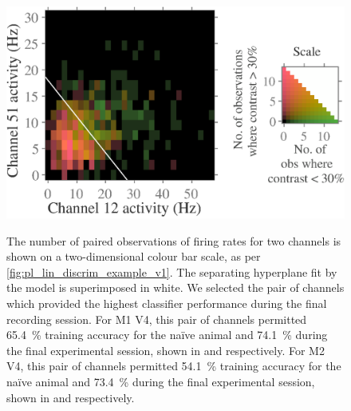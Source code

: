 \begin{figure}[htbp]
{        \includegraphics[scale=.29]{figs/decoding/lindiscrimexLCH-RG-log_cbl_v4_blanco_341_12vs51.eps}}
    \hspace*{\fill}\hspace{.2cm}\hspace*{\fill}
    \caption{
    The number of paired observations of firing rates for two channels is shown on a two-dimensional colour bar scale, as per \autoref{fig:pl_lin_discrim_example_v1}.
    The separating hyperplane fit by the model is superimposed in white.
    We selected the pair of channels which provided the highest classifier performance during the final recording session.
    For \ac{M1} \ac{V4}, this pair of channels permitted \SI{65.4}{\percent} training accuracy for the na\"{i}ve animal and \SI{74.1}{\percent} during the final experimental session, shown in \protect{} and \protect{} respectively.
    For \ac{M2} \ac{V4}, this pair of channels permitted \SI{54.1}{\percent} training accuracy for the na\"{i}ve animal and  \SI{73.4}{\percent} during the final experimental session, shown in \protect{} and \protect{} respectively.
}
    \label{fig:pl_lin_discrim_example_v4}
\end{figure}


